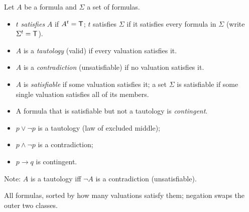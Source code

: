 \begin{definition}
Let $A$ be a formula and $\Sigma$ a set of formulas.
\begin{itemize}
  \item $t$ \emph{satisfies} $A$ if $A^t=\mathsf{T}$; $t$ satisfies $\Sigma$ if it satisfies
        every formula in $\Sigma$ (write $\Sigma^t=\mathsf{T}$).
  \item $A$ is a \emph{tautology} (valid) if every valuation satisfies it.
  \item $A$ is a \emph{contradiction} (unsatisfiable) if no valuation satisfies it.
  \item $A$ is \emph{satisfiable} if some valuation satisfies it; a set $\Sigma$ is
        satisfiable if some single valuation satisfies all of its members.
  \item A formula that is satisfiable but not a tautology is \emph{contingent}.
\end{itemize}
\end{definition}

\begin{itemize}
  \item $p\lor\neg p$ is a tautology (law of excluded middle);
  \item $p\land\neg p$ is a contradiction;
  \item $p \to q$ is contingent.
\end{itemize}
Note: $A$ is a tautology iff $\neg A$ is a contradiction (unsatisfiable).

\begin{center}

\small All formulas, sorted by how many valuations satisfy them; negation swaps the outer two classes.
\end{center}

